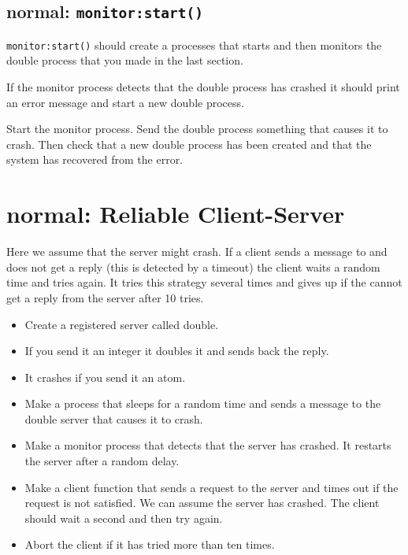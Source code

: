 \documentclass[12pt]{hitec}
\begin{document}
\subsection{normal: \texttt{monitor:start()}}

\verb+monitor:start()+ should create a processes that starts and
then monitors the double process that you made in the last section.
 
If the monitor process detects that the double process has crashed
it should print an error message and start a new double process.

Start the monitor process. Send the double process something that causes it
to crash. Then check that a new double process has been created and that
the system has recovered from the error.

\section{normal: Reliable Client-Server}

Here we assume that the server might crash. If a client sends a message to
and does not get a reply (this is detected by a timeout) the client
waits a random time and tries again. It tries this strategy several times
and gives up if the cannot get a reply from the server after 10 tries. 

\begin{itemize}

\item Create a registered server called double.

\item If you send it an integer it doubles it and sends back the reply.

\item It crashes if you send it an atom.

\item Make a process that sleeps for a random time and sends a message
  to the double server that causes it to crash.

\item Make a monitor process that detects that the server has
  crashed. It restarts the server after a random delay.

\item Make a client function that sends a request to the server and
  times out if the request is not satisfied. We can assume the server
  has crashed. The client should wait a second and then try again.

\item  Abort the client if it has tried more than ten times.
\end{itemize}
\end{document}
